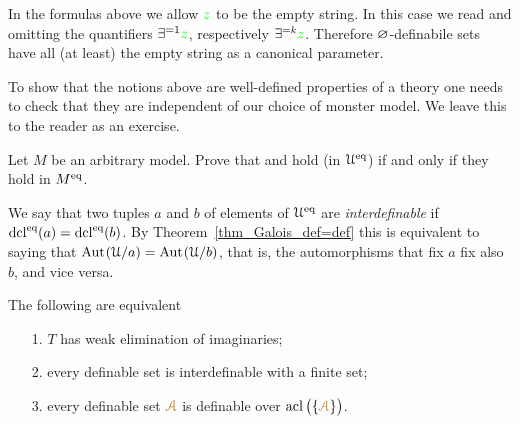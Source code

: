\documentclass[creche.tex]{subfiles}
\begin{document}
In the formulas above we allow ${\color{green} z}$ to be the empty string. In this case we read  and  omitting the quantifiers $\exists^{=1}{\color{green} z}$, respectively $\exists^{=k}{\color{green} z}$. Therefore $\varnothing$-definabile sets have all (at least) the empty string as a canonical parameter.

To show that the notions above are well-defined properties of a theory one needs to check that they are independent of our choice of monster model. We leave this to the reader as an exercise.

\begin{exercise}
Let $M$ be an arbitrary model. Prove that  and  hold (in $\EuScript U^{{\rm eq}}$) if and only if they hold in $M^{{\rm eq}}$.\QED
\end{exercise}

We say that two tuples $a$ and $b$ of elements of $\EuScript U^{{\rm eq}}$ are \emph{interdefinable\/} if $\mathop{\rm dcl}^{{\rm eq}}(a)=\mathop{\rm dcl}^{{\rm eq}}(b)$. By Theorem~\ref{thm_Galois_def=def} this is equivalent to saying that $\textrm{Aut\kern.15ex}(\EuScript U/a)=\textrm{Aut\kern.15ex}(\EuScript U/b)$, that is, the automorphisms that fix $a$ fix also $b$, and vice versa.

\begin{theorem}\label{elimimd}
The following are equivalent
\begin{itemize}
\item[1.] $T$ has weak elimination of imaginaries;
\item[2.] every definable set is interdefinable with a finite set;
\item[3.] every definable set ${\color{brown}\EuScript A}$ is definable over $\mathop{\rm acl}\big(\{{\color{brown}\EuScript A}\}\big)$.
\end{itemize}
\end{theorem}
\end{document}
